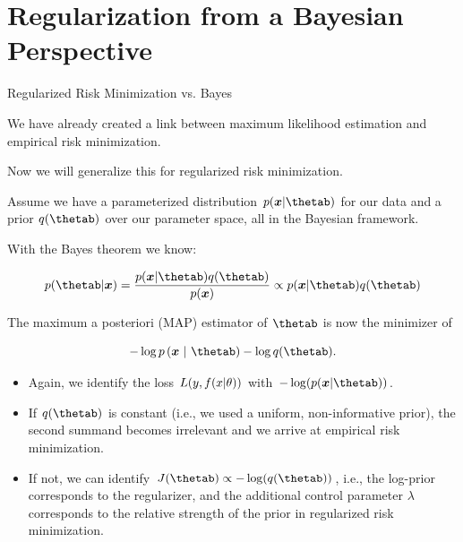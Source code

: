 \section{Regularization from a Bayesian Perspective}

\begin{vbframe} {Regularized Risk Minimization vs. Bayes}

We have already created a link between maximum likelihood estimation and 
empirical risk minimization.

\lz 

Now we will generalize this for regularized risk minimization.

\lz

Assume we have a parameterized distribution $p(\xv | \thetab)$ for our data and 
a prior $q(\thetab)$ over our parameter space, all in the Bayesian framework.

\lz 

With the Bayes theorem we know:

$$
p(\thetab | \xv) = \frac{p(\xv | \thetab) q(\thetab) }{p(\xv)} \propto 
p(\xv | \thetab) q(\thetab)
$$

\framebreak

The maximum a posteriori (MAP) estimator of $\thetab$ is now the minimizer of

$$
- \log p\left(\xv ~|~ \thetab\right) - \log q(\thetab).
$$

\begin{itemize}
  \item Again, we identify the loss $L(y, f(x | \theta))$ with $-\log(p(\xv | \thetab))$.
  \item If $q(\thetab)$ is constant (i.e., we used a uniform, non-informative 
  prior), the second summand becomes irrelevant and we arrive 
  at empirical risk minimization.
  \item If not, we can identify $J(\thetab) \propto -\log(q(\thetab))$, i.e., 
  the log-prior corresponds to the regularizer, and the additional control 
  parameter $\lambda$ corresponds to the relative strength of the prior in 
  regularized risk minimization.
\end{itemize}

\framebreak

\begin{figure}
  \centering
\end{figure}


\end{vbframe}
